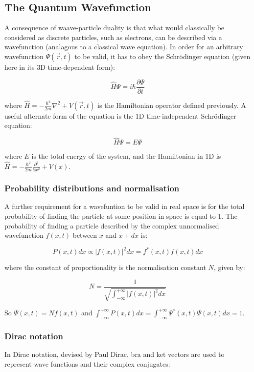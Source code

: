 \subsection{The Quantum Wavefunction}

A consequence of waave-particle duality is that what would classically be considered as discrete particles, such as electrons, can be described via a wavefunction (analagous to a classical wave equation). In order for an arbitrary wavefunction $\Psi(\vec{r}, t)$ to be valid, it has to obey the Schr\"odinger equation (given here in its 3D time-dependent form):

\[ \hat{H}\Psi = i\hbar\frac{\partial\Psi}{\partial t} \]

where $\hat{H} = -\frac{\hbar^2}{2m}\nabla^2 + V(\vec{r}, t)$ is the Hamiltonian operator defined previously. A useful alternate form of the equation is the 1D time-independent Schr\"odinger equation:

\[ \hat{H}\Psi = E\Psi \]

where $E$ is the total energy of the system, and the Hamiltonian in 1D is $\hat{H} = -\frac{\hbar^2}{2m}\frac{\partial^2}{\partial x^2} + V(x)$.

\subsubsection*{Probability distributions and normalisation}

A further requirement for a wavefuntion to be valid in real space is for the total probability of finding the particle at some position in space is equal to 1. The probability of finding a particle described by the complex unnormalised wavefunction $f(x,t)$ between $x$ and $x+dx$ is:

\[ P(x,t)dx \propto \left|f(x,t)\right|^2 dx = f^*(x,t)f(x,t) dx \]

where the constant of proportionality is the normalisation constant $N$, given by:

\[ N = \frac{1}{\sqrt{\int_{-\infty}^{+\infty} \left|f(x,t)\right|^2 dx}} \]

So $\Psi(x,t) = Nf(x,t)$ and $\int_{-\infty}^{+\infty} P(x,t)dx = \int_{-\infty}^{+\infty} \Psi^*(x,t)\Psi(x,t)dx = 1$.

\subsubsection*{Dirac notation}

In Dirac notation, devised by Paul Dirac, bra and ket vectors are used to represent wave functions and their complex conjugates:


